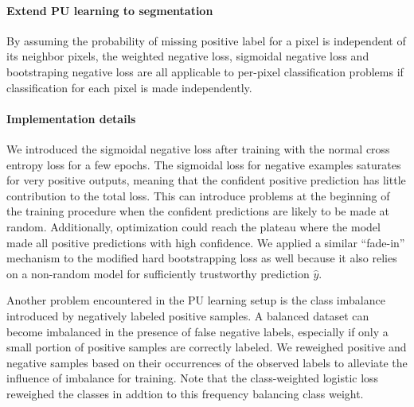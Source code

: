 \paragraph{Extend PU learning to segmentation}
By assuming the probability of missing positive label for a pixel is independent of its neighbor pixels, the weighted negative loss, sigmoidal negative loss and bootstraping negative loss are all applicable to per-pixel classification problems if classification for each pixel is made independently.


\paragraph{Implementation details}
We introduced the sigmoidal negative loss after training with the normal cross entropy loss for a few epochs.
The sigmoidal loss for negative examples saturates for very positive outputs, meaning that the confident positive prediction has little contribution to the total loss.
This can introduce problems at the beginning of the training procedure when the confident predictions are likely to be made at random.
Additionally, optimization could reach the plateau where the model made all positive predictions with high confidence.
We applied a similar ``fade-in'' mechanism to the modified hard bootstrapping loss as well because it also relies on a non-random model for sufficiently trustworthy prediction $\hat{y}$.


Another problem encountered in the PU learning setup is the class imbalance introduced by negatively labeled positive samples.
A balanced dataset can become imbalanced in the presence of false negative labels, especially if only a small portion of positive samples are correctly labeled.
We reweighed positive and negative samples based on their occurrences of the observed labels to alleviate the influence of imbalance for training.
Note that the class-weighted logistic loss reweighed the classes in addtion to this frequency balancing class weight.

